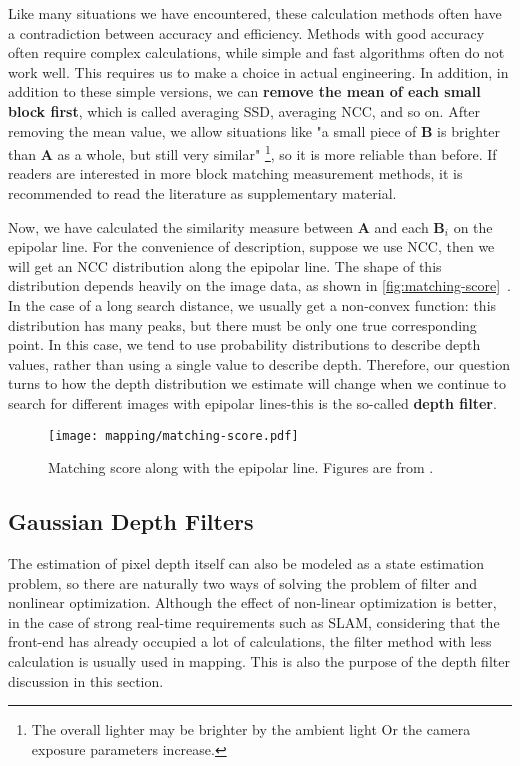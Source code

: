 Like many situations we have encountered, these calculation methods often have a contradiction between accuracy and efficiency. Methods with good accuracy often require complex calculations, while simple and fast algorithms often do not work well. This requires us to make a choice in actual engineering. In addition, in addition to these simple versions, we can \textbf{remove the mean of each small block first}, which is called averaging SSD, averaging NCC, and so on. After removing the mean value, we allow situations like "a small piece of $\bm{B}$ is brighter than $\bm{A}$ as a whole, but still very similar" \footnote{The overall lighter may be brighter by the ambient light Or the camera exposure parameters increase. }, so it is more reliable than before. If readers are interested in more block matching measurement methods, it is recommended to read the literature \cite{stereo-matching-website, Hirschmuller2007} as supplementary material.

Now, we have calculated the similarity measure between $\bm{A}$ and each $\bm{B}_i$ on the epipolar line. For the convenience of description, suppose we use NCC, then we will get an NCC distribution along the epipolar line. The shape of this distribution depends heavily on the image data, as shown in \autoref{fig:matching-score}~. In the case of a long search distance, we usually get a non-convex function: this distribution has many peaks, but there must be only one true corresponding point. In this case, we tend to use probability distributions to describe depth values, rather than using a single value to describe depth. Therefore, our question turns to how the depth distribution we estimate will change when we continue to search for different images with epipolar lines-this is the so-called \textbf{depth filter}.

\begin{figure}[!htp]
	\centering
	\texttt{[image: mapping/matching-score.pdf]}
	\caption{Matching score along with the epipolar line. Figures are from \cite{Vogiatzis2011}.}
	\label{fig:matching-score}
\end{figure}

\subsection{Gaussian Depth Filters}
The estimation of pixel depth itself can also be modeled as a state estimation problem, so there are naturally two ways of solving the problem of filter and nonlinear optimization. Although the effect of non-linear optimization is better, in the case of strong real-time requirements such as SLAM, considering that the front-end has already occupied a lot of calculations, the filter method with less calculation is usually used in mapping. This is also the purpose of the depth filter discussion in this section.

